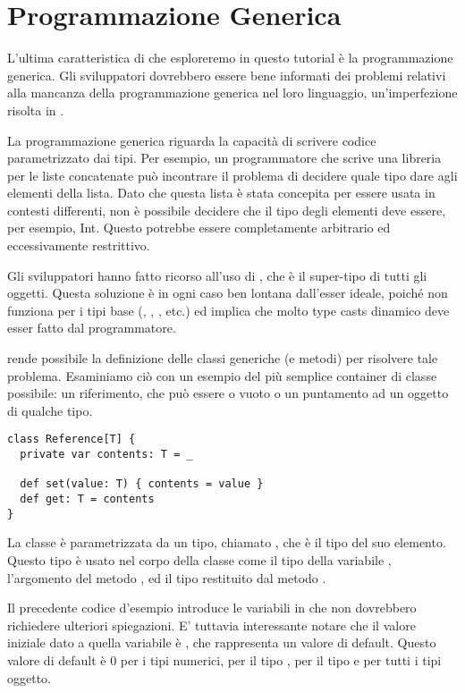 \section{Programmazione Generica}
\label{sec:genericity}

L'ultima caratteristica di \Scala che esploreremo in questo tutorial \`e la programmazione generica. Gli sviluppatori \Java dovrebbero essere bene informati dei problemi relativi alla mancanza della programmazione generica nel loro linguaggio, un'imperfezione risolta in .

La programmazione generica riguarda la capacit\`a   di scrivere codice parametrizzato dai tipi.  Per esempio, un programmatore che scrive una libreria per le liste concatenate pu\`o incontrare il problema di decidere quale tipo dare agli elementi della lista. Dato che questa lista \`e stata concepita per essere usata in contesti differenti, non \`e possibile decidere  che il tipo degli elementi deve essere, per esempio, Int. Questo potrebbe essere completamente arbitrario ed eccessivamente restrittivo.

Gli sviluppatori \Java hanno fatto ricorso all'uso di , che \`e il super-tipo di tutti gli oggetti. Questa soluzione \`e in ogni caso ben lontana dall'esser ideale, poich\'e non funziona per i tipi base (, , , etc.) ed implica che molto type casts dinamico deve esser fatto dal programmatore.

\Scala rende possibile la definizione delle classi generiche (e metodi) per risolvere tale problema. Esaminiamo ci\`o con un esempio del pi\`u semplice container di classe possibile: un riferimento, che pu\`o essere o vuoto o un puntamento ad un oggetto di qualche tipo.
\begin{lstlisting}
class Reference[T] {
  private var contents: T = _

  def set(value: T) { contents = value }
  def get: T = contents
}
\end{lstlisting}
La classe  \`e parametrizzata da un tipo, chiamato , che \`e il tipo del suo elemento. Questo tipo \`e usato nel corpo della classe come il tipo della variabile , l'argomento del metodo , ed il tipo restituito dal metodo .

Il precedente codice d'esempio introduce le variabili in \Scala che non dovrebbero richiedere ulteriori spiegazioni. E' tuttavia interessante notare che il valore iniziale dato a quella variabile \`e \code{_}, che rappresenta un valore di default. Questo valore di default \`e 0 per i tipi numerici,  per il tipo , \code{()} per il tipo  e  per tutti i tipi oggetto.


